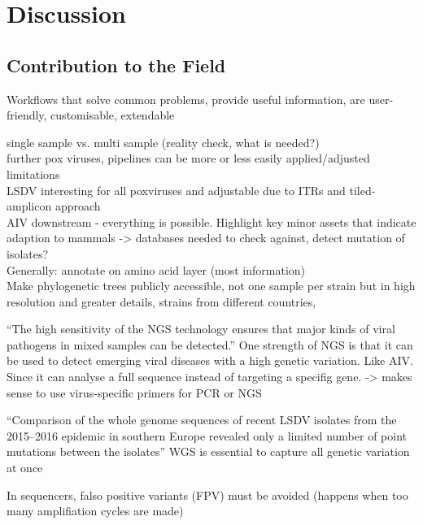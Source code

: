 \chapter{Discussion}\label{chap:discussion}

\section{Contribution to the Field}
Workflows that solve common problems, provide useful information, are user-friendly, customisable, extendable

single sample vs. multi sample (reality check, what is needed?) \\
further pox viruses, pipelines can be more or less easily applied/adjusted \\
limitations \\
\ac{LSDV} interesting for all poxviruses and adjustable due to \acp{ITR} and tiled-amplicon approach \\
\ac{AIV} downstream - everything is possible. Highlight key minor assets that indicate adaption to mammals -> databases needed to check against, detect mutation of isolates? \\
Generally: annotate on amino acid layer (most information) \\

Make phylogenetic trees publicly accessible, not one sample per strain but in high resolution and greater details, strains from different countries,

``The high sensitivity of the \ac{NGS} technology ensures that major kinds of viral pathogens in mixed samples can be detected.''
One strength of \ac{NGS} is that it can be used to detect emerging viral diseases with a high genetic variation. Like \ac{AIV}. Since it can analyse a full sequence instead of targeting a specifig gene. -> makes sense to use virus-specific primers for \ac{PCR} or \ac{NGS} 

``Comparison of the whole genome sequences of recent \ac{LSDV} isolates from the 2015–2016 epidemic in southern Europe revealed only a limited number of point mutations between the isolates'' \ac{WGS} is essential to capture all genetic variation at once

In sequencers, falso positive variants (\ac{FPV}) must be avoided (happens when too many amplifiation cycles are made)



